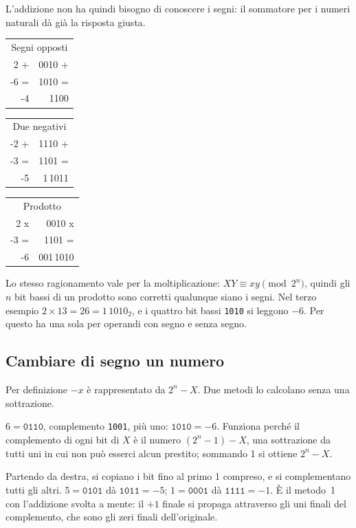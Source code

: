 \smallskip
L'addizione non ha quindi bisogno di conoscere i segni: il sommatore per i
numeri naturali dà già la risposta giusta.

\begin{center}\ttfamily
\begin{tabular}{@{}r@{\quad}r@{}}
\multicolumn{2}{c}{\textsf{\small Segni opposti}}\\
2 + & 0010 +\\ -6 = & 1010 =\\\hline -4 & 1100
\end{tabular}\qquad\qquad
\begin{tabular}{@{}r@{\quad}r@{}}
\multicolumn{2}{c}{\textsf{\small Due negativi}}\\
-2 + & 1110 +\\ -3 = & 1101 =\\\hline -5 & \textcolor{prgcomment}{1}\,1011
\end{tabular}\qquad\qquad
\begin{tabular}{@{}r@{\quad}r@{}}
\multicolumn{2}{c}{\textsf{\small Prodotto}}\\
2 x & 0010 x\\ -3 = & 1101 =\\\hline -6 & \textcolor{prgcomment}{001}\,1010
\end{tabular}
\end{center}

Lo stesso ragionamento vale per la moltiplicazione: $XY\equiv xy\pmod{2^{n}}$,
quindi gli $n$ bit bassi di un prodotto sono corretti qualunque siano i segni.
Nel terzo esempio $2\times 13 = 26 = 1\,1010_2$, e i quattro bit bassi
\texttt{1010} si leggono $-6$. Per questo \riscv ha una sola  per
operandi con segno e senza segno.

\subsection{Cambiare di segno un numero}

Per definizione $-x$ è rappresentato da $2^{n}-X$. Due metodi lo calcolano
senza una sottrazione.

\begin{description}[style=nextline,leftmargin=1.5em]
\item[Metodo 1: complementare ogni bit, poi sommare 1.]
  $6=\texttt{0110}$, complemento \texttt{1001}, più uno: $\texttt{1010}=-6$.
  Funziona perché il complemento di ogni bit di $X$ è il numero $(2^{n}-1)-X$,
  una sottrazione da tutti uni in cui non può esserci alcun prestito; sommando
  1 si ottiene $2^{n}-X$.
\item[Metodo 2: scorrere da destra.] Partendo da destra, si copiano i bit fino
  al primo 1 compreso, e si complementano tutti gli altri. $5=\texttt{0101}$ dà
  $\texttt{1011}=-5$; $1=\texttt{0001}$ dà $\texttt{1111}=-1$. È il metodo~1
  con l'addizione svolta a mente: il $+1$ finale si propaga attraverso gli uni
  finali del complemento, che sono gli zeri finali dell'originale.
\end{description}

